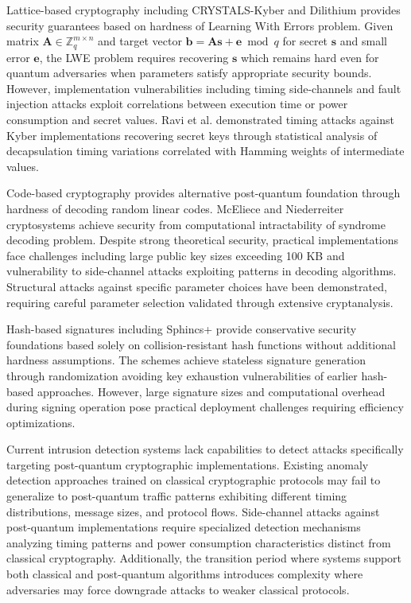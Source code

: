 Lattice-based cryptography including CRYSTALS-Kyber and Dilithium provides security guarantees based on hardness of Learning With Errors problem. Given matrix $\mathbf{A} \in \mathbb{Z}_q^{m \times n}$ and target vector $\mathbf{b} = \mathbf{A}\mathbf{s} + \mathbf{e} \bmod q$ for secret $\mathbf{s}$ and small error $\mathbf{e}$, the LWE problem requires recovering $\mathbf{s}$ which remains hard even for quantum adversaries when parameters satisfy appropriate security bounds. However, implementation vulnerabilities including timing side-channels and fault injection attacks exploit correlations between execution time or power consumption and secret values. Ravi et al. demonstrated timing attacks against Kyber implementations recovering secret keys through statistical analysis of decapsulation timing variations correlated with Hamming weights of intermediate values.

Code-based cryptography provides alternative post-quantum foundation through hardness of decoding random linear codes. McEliece and Niederreiter cryptosystems achieve security from computational intractability of syndrome decoding problem. Despite strong theoretical security, practical implementations face challenges including large public key sizes exceeding 100 KB and vulnerability to side-channel attacks exploiting patterns in decoding algorithms. Structural attacks against specific parameter choices have been demonstrated, requiring careful parameter selection validated through extensive cryptanalysis.

Hash-based signatures including Sphincs+ provide conservative security foundations based solely on collision-resistant hash functions without additional hardness assumptions. The schemes achieve stateless signature generation through randomization avoiding key exhaustion vulnerabilities of earlier hash-based approaches. However, large signature sizes and computational overhead during signing operation pose practical deployment challenges requiring efficiency optimizations.

Current intrusion detection systems lack capabilities to detect attacks specifically targeting post-quantum cryptographic implementations. Existing anomaly detection approaches trained on classical cryptographic protocols may fail to generalize to post-quantum traffic patterns exhibiting different timing distributions, message sizes, and protocol flows. Side-channel attacks against post-quantum implementations require specialized detection mechanisms analyzing timing patterns and power consumption characteristics distinct from classical cryptography. Additionally, the transition period where systems support both classical and post-quantum algorithms introduces complexity where adversaries may force downgrade attacks to weaker classical protocols.

